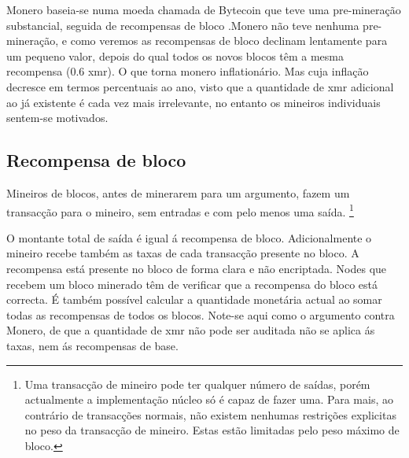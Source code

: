 Monero baseia-se numa moeda chamada de Bytecoin que teve uma pre-mineração substancial, seguida de recompensas de bloco \cite{monero-history}.\newline Monero não teve nenhuma pre-mineração, e como veremos as recompensas de bloco declinam lentamente para um pequeno valor, depois do qual todos os novos blocos têm a mesma recompensa (0.6 xmr). O que torna monero inflationário. Mas cuja inflação decresce em termos percentuais ao ano, visto que a quantidade de xmr adicional ao já existente é cada vez mais irrelevante, no entanto os mineiros individuais sentem-se motivados.
\subsection{Recompensa de bloco}
\label{subsec:block-reward} %

Mineiros de blocos, antes de minerarem para um argumento, fazem um transacção para o mineiro, sem entradas e com pelo menos uma saída.
\footnote{Uma transacção de mineiro pode ter qualquer número de saídas, porém actualmente a implementação núcleo só é capaz de fazer uma. Para mais, ao contrário de transacções normais, não existem nenhumas restrições explicitas no peso da transacção de mineiro. Estas estão limitadas pelo peso máximo de bloco.} 

O montante total de saída é igual á recompensa de bloco. Adicionalmente o mineiro recebe também as taxas de cada transacção presente no bloco. A recompensa está presente no bloco de forma clara e não encriptada. Nodes que recebem um bloco minerado têm de verificar que a recompensa do bloco está correcta. É também possível calcular a quantidade monetária actual ao somar todas as recompensas de todos os blocos. Note-se aqui como o argumento contra Monero, de que a quantidade de xmr não pode ser auditada não se aplica ás taxas, nem ás recompensas de base.

